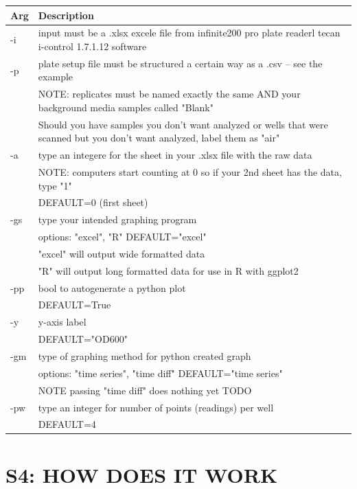 \documentclass[12pt]{article}
\begin{document}
\begin{center}
\begin{xltabular}{\textwidth}{lX}
Arg & Description\\
\hline
-i & input must be a .xlsx excele file from infinite200 pro plate readerl tecan i-control 1.7.1.12 software\\
-p & plate setup file must be structured a certain way as a .csv -- see the example\\
 & NOTE: replicates must be named exactly the same AND your background media samples called "Blank"\\
 & Should you have samples you don't want analyzed or wells that were scanned but you don't want analyzed, label them as "air"\\
-a & type an integere for the sheet in your .xlsx file with the raw data\\
 & NOTE: computers start counting at 0 so if your 2nd sheet has the data, type "1"\\
 & DEFAULT=0 (first sheet)\\
-gs & type your intended graphing program\\
 & options: "excel", "R" DEFAULT="excel"\\
 & "excel" will output wide formatted data\\
 & "R" will output long formatted data for use in R with ggplot2\\
-pp & bool to autogenerate a python plot\\
 & DEFAULT=True\\
-y & y-axis label\\
 & DEFAULT="OD600"\\
-gm & type of graphing method for python created graph\\
 & options: "time series", "time diff" DEFAULT="time series"\\
 & NOTE passing "time diff" does nothing yet TODO\\
-pw & type an integer for number of points (readings) per well\\
 & DEFAULT=4\\
\end{xltabular}
\end{center}

\section*{S4: HOW DOES IT WORK}
\label{sec:org1e4355a}
\end{document}
